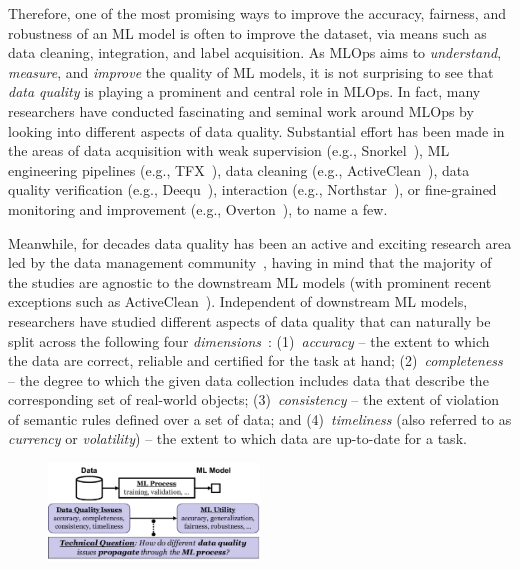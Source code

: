 \documentclass[11pt]{article}
\begin{document}
Therefore, one of the most promising 
ways to improve the accuracy, fairness, and robustness of an ML model is often to 
improve the dataset, via means such as
data cleaning, integration, and label acquisition. As MLOps aims to 
\textit{understand}, \textit{measure}, and \textit{improve} the quality
of ML models, it is not surprising to see that 
\textit{data quality} is playing a prominent and central role in MLOps. In fact,
many researchers have conducted fascinating and seminal
work around MLOps by looking into different aspects of 
data quality. Substantial effort has been made in the areas of data acquisition with weak supervision (e.g., Snorkel~\cite{ratner2017snorkel}), ML engineering pipelines (e.g., TFX~\cite{katsiapis2019towards}), data cleaning (e.g., ActiveClean~\cite{krishnan2016activeclean}), data quality verification (e.g., Deequ~\cite{schelter2019differential, schelter2018automating}), interaction (e.g., Northstar~\cite{kraska2018northstar}), or fine-grained monitoring and improvement (e.g., Overton~\cite{re2019overton}), to name a few.

Meanwhile, for 
decades data quality has been an active and exciting
research area led by the data management community~\cite{batini2009methodologies,strong1997data,scannapieco2002data},
having in mind that the majority of the studies are 
agnostic to the downstream ML models
(with prominent recent exceptions such as
ActiveClean~\cite{krishnan2016activeclean}).
Independent of downstream ML models,
researchers have studied different aspects of
data quality that can naturally be split across the following four \textit{dimensions}~\cite{batini2009methodologies}: (1)~\textit{accuracy} -- the extent to which the data are correct, reliable and certified for the task at hand;
(2)~\textit{completeness} -- the degree to which the given data collection includes data that describe the corresponding set of real-world objects;
(3)~\textit{consistency} -- the extent of violation of semantic rules defined over a set of data; and 
(4)~\textit{timeliness} (also referred to as \textit{currency} or \textit{volatility}) -- the extent to which data are up-to-date for a task.

\begin{figure}
\vspace{-1em}
\begin{center}
\includegraphics[width=0.5\textwidth]{submissions/data-quality-ml-ops/figs/techq.pdf}
\end{center}
\vspace{-2em}
\vspace{-1em}
\end{figure}
\end{document}
